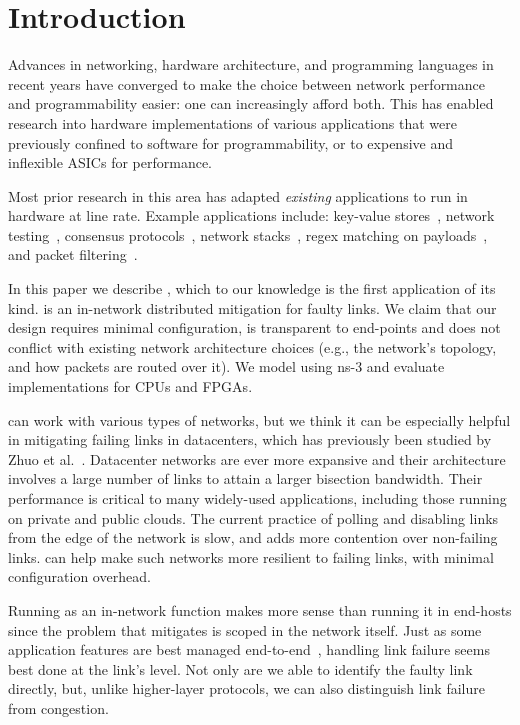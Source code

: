 \section{Introduction}
Advances in networking, hardware architecture, and programming
languages in recent years have converged to make the choice between
network performance and programmability easier: one can increasingly
afford both.
This has enabled research into hardware implementations of various
applications that were previously confined to software for
programmability, or to expensive and inflexible ASICs for performance.

Most prior research in this area has adapted \emph{existing}
applications to run in hardware at line rate.
Example applications include:
key-value stores~\cite{Li:2017:KHI:3132747.3132756},
network testing~\cite{Shahbaz:2013:AOS:2537857.2537880},
consensus protocols~\cite{Istvan:2016:CBI:2930611.2930639},
network stacks~\cite{Istvan:2016:CBI:2930611.2930639},
regex matching on payloads~\cite{Woods:2010:CED:1920841.1920926},
and packet filtering~\cite{Fiessler:2016:HVH:2881025.2881033}.

In this paper we describe \OurSys, which to our knowledge is the first application
of its kind. \OurSys is an in-network distributed
mitigation for faulty links.  We claim that our design requires
minimal configuration, is transparent to
end-points and does not conflict
with existing network architecture choices (e.g., the network's topology,
and how packets are routed over it). We model \OurSys using ns-3 and evaluate
implementations for CPUs and FPGAs.

\OurSys can work with various types of networks, but we think it can
be especially helpful in mitigating failing links in datacenters,
which has previously been studied by Zhuo et
al.~\cite{Zhuo:2017:UMP:3098822.3098849}.
Datacenter networks are ever more expansive and their architecture
involves a large number of links to attain a larger bisection
bandwidth. Their performance is critical to many widely-used
applications, including those running on private and public clouds.
The current practice of polling and disabling links from the edge of
the network is slow, and adds more contention over non-failing links.
\OurSys can help make such networks more resilient to failing links, with minimal configuration overhead.

Running \OurSys as an in-network function makes more sense than
running it in end-hosts since the problem that \OurSys mitigates is
scoped in the network itself. Just as some application features are
best managed end-to-end~\cite{Saltzer84end-to-endarguments}, handling
link failure seems best done at the link's level. Not only are we able to
identify the faulty link directly, but, unlike higher-layer protocols,
we can also distinguish link failure from congestion.

